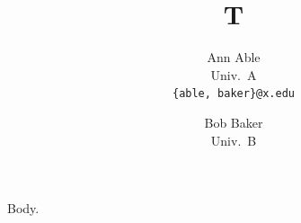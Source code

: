 \documentclass{article}
\title{T}
\author{Ann Able\\ Univ.\ A\\ \texttt{\{able, baker\}@x.edu} \and Bob Baker\\ Univ.\ B}
\begin{document}
\maketitle
Body.
\end{document}
